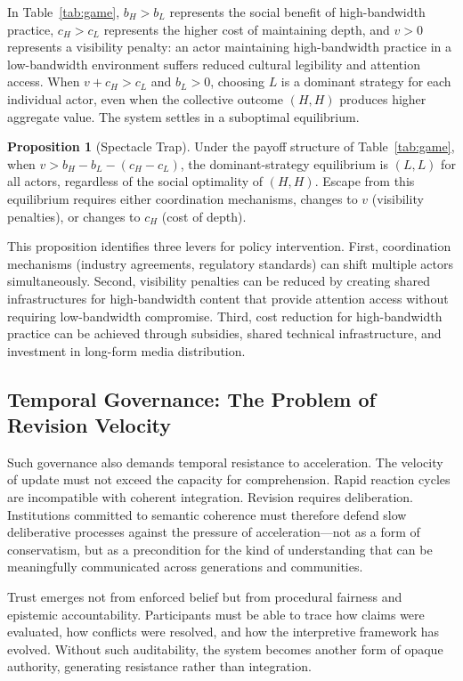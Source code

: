 \documentclass[12pt]{article}
\theoremstyle{definition}
\newtheorem{proposition}{Proposition}[section]
\theoremstyle{plain}
\begin{document}
In Table~\ref{tab:game}, $b_H > b_L$ represents the social benefit of high-bandwidth practice, $c_H > c_L$ represents the higher cost of maintaining depth, and $v > 0$ represents a visibility penalty: an actor maintaining high-bandwidth practice in a low-bandwidth environment suffers reduced cultural legibility and attention access. When $v + c_H > c_L$ and $b_L > 0$, choosing $L$ is a dominant strategy for each individual actor, even when the collective outcome $(H, H)$ produces higher aggregate value. The system settles in a suboptimal equilibrium.

\begin{proposition}[Spectacle Trap]
Under the payoff structure of Table~\ref{tab:game}, when $v > b_H - b_L - (c_H - c_L)$, the dominant-strategy equilibrium is $(L, L)$ for all actors, regardless of the social optimality of $(H, H)$. Escape from this equilibrium requires either coordination mechanisms, changes to $v$ (visibility penalties), or changes to $c_H$ (cost of depth).
\end{proposition}

This proposition identifies three levers for policy intervention. First, coordination mechanisms (industry agreements, regulatory standards) can shift multiple actors simultaneously. Second, visibility penalties can be reduced by creating shared infrastructures for high-bandwidth content that provide attention access without requiring low-bandwidth compromise. Third, cost reduction for high-bandwidth practice can be achieved through subsidies, shared technical infrastructure, and investment in long-form media distribution.

\subsection{Temporal Governance: The Problem of Revision Velocity}

Such governance also demands temporal resistance to acceleration. The velocity of update must not exceed the capacity for comprehension. Rapid reaction cycles are incompatible with coherent integration. Revision requires deliberation. Institutions committed to semantic coherence must therefore defend slow deliberative processes against the pressure of acceleration---not as a form of conservatism, but as a precondition for the kind of understanding that can be meaningfully communicated across generations and communities.

Trust emerges not from enforced belief but from procedural fairness and epistemic accountability. Participants must be able to trace how claims were evaluated, how conflicts were resolved, and how the interpretive framework has evolved. Without such auditability, the system becomes another form of opaque authority, generating resistance rather than integration.
\end{document}
